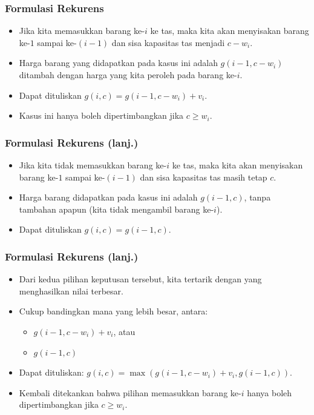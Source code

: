 \begin{frame} 
\frametitle{Formulasi Rekurens}
\begin{itemize}
  \item Jika kita memasukkan barang ke-$i$ ke tas, maka kita akan menyisakan barang ke-$1$ sampai ke-$(i-1)$ dan sisa kapasitas tas menjadi $c-w_i$. 
  \item Harga barang yang didapatkan pada kasus ini adalah $g(i-1,c-w_i)$ ditambah dengan harga yang kita peroleh pada barang ke-$i$.
  \item Dapat dituliskan $g(i, c) = g(i-1, c-w_i) + v_i$.
  \item Kasus ini hanya boleh dipertimbangkan jika $c \geq w_i$.
\end{itemize}
\end{frame}

\begin{frame} 
\frametitle{Formulasi Rekurens (lanj.)}
\begin{itemize}
  \item Jika kita tidak memasukkan barang ke-$i$ ke tas, maka kita akan menyisakan barang ke-$1$ sampai ke-$(i-1)$ dan sisa kapasitas tas masih tetap $c$.
  \item Harga barang didapatkan pada kasus ini adalah $g(i-1,c)$, tanpa tambahan apapun (kita tidak mengambil barang ke-$i$).
  \item Dapat dituliskan $g(i, c) = g(i-1, c)$.
\end{itemize}
\end{frame}

\begin{frame} 
\frametitle{Formulasi Rekurens (lanj.)}
\begin{itemize}
  \item Dari kedua pilihan keputusan tersebut, kita tertarik dengan yang menghasilkan nilai terbesar.
  \item Cukup bandingkan mana yang lebih besar, antara:
  \begin{itemize}
    \item $g(i-1, c-w_i) + v_i$, atau
    \item $g(i-1, c)$
  \end{itemize}
  \item Dapat dituliskan: $g(i, c) = \max(g(i-1,c-w_i)+v_i,g(i-1,c))$. \newline
  \item Kembali ditekankan bahwa pilihan memasukkan barang ke-$i$ hanya boleh dipertimbangkan jika $c \geq w_i$.
\end{itemize}
\end{frame}

